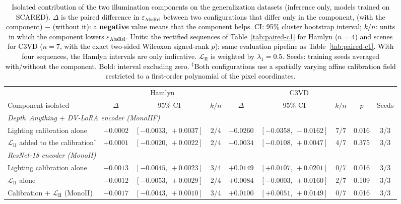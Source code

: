 \documentclass[a4paper,fleqn]{cas-dc}
\begin{document}
\begin{table}[t]
\centering
\color{red}
\caption{\textcolor{black}{Isolated contribution of the two illumination components on the generalization datasets (inference only, models trained on SCARED). $\Delta$ is the paired difference in $\varepsilon_\textrm{AbsRel}$ between two configurations that differ only in the component, (with the component) $-$ (without it): a \textbf{negative} value means that the component helps. CI: 95\% cluster bootstrap interval; $k/n$: units in which the component lowers $\varepsilon_\textrm{AbsRel}$. Units: the rectified sequences of Table~\ref{tab:paired-c1} for Hamlyn ($n=4$) and scenes for C3VD ($n=7$, with the exact two-sided Wilcoxon signed-rank $p$); same evaluation pipeline as Table~\ref{tab:paired-c1}. With four sequences, the Hamlyn intervals are only indicative. $\mathcal{L}_\textrm{II}$ is weighted by $\lambda_1=0.5$. Seeds: training seeds averaged with/without the component. Bold: interval excluding zero. $^{\dagger}$Both configurations use a spatially varying affine calibration field restricted to a first-order polynomial of the pixel coordinates.}}
\label{tab:components-crossdomain}
\small
\setlength{\tabcolsep}{5pt}
\begin{tabular}{l rcc rccc c}
\toprule
 & \multicolumn{3}{c}{Hamlyn} & \multicolumn{4}{c}{C3VD} & \\
\cmidrule(lr){2-4}\cmidrule(lr){5-8}
Component isolated & \multicolumn{1}{c}{$\Delta$} & 95\% CI & $k/n$ & \multicolumn{1}{c}{$\Delta$} & 95\% CI & $k/n$ & $p$ & Seeds \\
\midrule
\multicolumn{9}{l}{\emph{Depth~Anything $+$ DV-LoRA encoder (MonoIIF)}} \\
\quad Lighting calibration alone & $+0.0002$ & $[-0.0033,\ +0.0037]$ & 2/4 & $\mathbf{-0.0260}$ & $[-0.0358,\ -0.0162]$ & 7/7 & 0.016 & 3/3 \\
\quad $\mathcal{L}_\textrm{II}$ added to the calibration$^{\dagger}$ & $+0.0001$ & $[-0.0020,\ +0.0022]$ & 2/4 & $-0.0034$ & $[-0.0108,\ +0.0047]$ & 4/7 & 0.375 & 3/3 \\
\midrule
\multicolumn{9}{l}{\emph{ResNet-18 encoder (MonoII)}} \\
\quad Lighting calibration alone & $-0.0013$ & $[-0.0045,\ +0.0023]$ & 3/4 & $\mathbf{+0.0149}$ & $[+0.0107,\ +0.0201]$ & 0/7 & 0.016 & 3/3 \\
\quad $\mathcal{L}_\textrm{II}$ alone & $-0.0012$ & $[-0.0053,\ +0.0029]$ & 2/4 & $+0.0084$ & $[-0.0003,\ +0.0160]$ & 2/7 & 0.109 & 3/3 \\
\quad Calibration $+$ $\mathcal{L}_\textrm{II}$ (MonoII) & $-0.0017$ & $[-0.0043,\ +0.0010]$ & 3/4 & $\mathbf{+0.0100}$ & $[+0.0051,\ +0.0149]$ & 0/7 & 0.016 & 3/3 \\
\bottomrule
\end{tabular}
\end{table}
\end{document}
